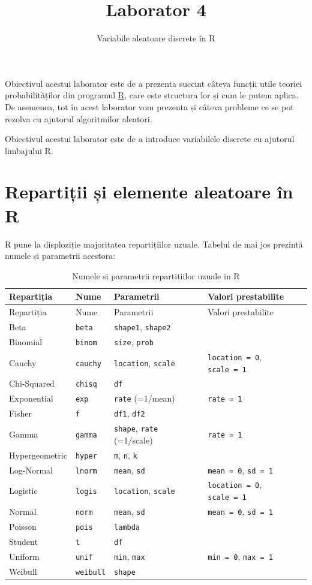 \documentclass[]{article}
\title{Laborator 4}
\subtitle{Variabile aleatoare discrete în R}
\author{}
\date{}
\begin{document}
\maketitle

\thispagestyle{fancy}

Obiectivul acestui laborator este de a prezenta succint câteva funcții
utile teoriei probabilităților din programul
\href{https://cran.r-project.org/}{R}, care este structura lor și cum le
putem aplica. De asemenea, tot în acest laborator vom prezenta și câteva
probleme ce se pot rezolva cu ajutorul algoritmilor aleatori.

Obiectivul acestui laborator este de a introduce variabilele discrete cu
ajutorul limbajului R.

\section{Repartiții și elemente aleatoare în
R}\label{repartitii-si-elemente-aleatoare-in-r}

R pune la disploziție majoritatea repartițiilor uzuale. Tabelul de mai
jos prezintă numele și parametrii acestora:

\begin{longtable}[]{@{}llll@{}}
\caption{Numele si parametrii repartitiilor uzuale in R}\tabularnewline
\toprule
Repartiția & Nume & Parametrii & Valori prestabilite\tabularnewline
\midrule
\endfirsthead
\toprule
Repartiția & Nume & Parametrii & Valori prestabilite\tabularnewline
\midrule
\endhead
Beta & \texttt{beta} & \texttt{shape1}, \texttt{shape2} &\tabularnewline
Binomial & \texttt{binom} & \texttt{size}, \texttt{prob}
&\tabularnewline
Cauchy & \texttt{cauchy} & \texttt{location}, \texttt{scale} &
\texttt{location\ =\ 0}, \texttt{scale\ =\ 1}\tabularnewline
Chi-Squared & \texttt{chisq} & \texttt{df} &\tabularnewline
Exponential & \texttt{exp} & \texttt{rate} (=1/mean) &
\texttt{rate\ =\ 1}\tabularnewline
Fisher & \texttt{f} & \texttt{df1}, \texttt{df2} &\tabularnewline
Gamma & \texttt{gamma} & \texttt{shape}, \texttt{rate} (=1/scale) &
\texttt{rate\ =\ 1}\tabularnewline
Hypergeometric & \texttt{hyper} & \texttt{m}, \texttt{n}, \texttt{k}
&\tabularnewline
Log-Normal & \texttt{lnorm} & \texttt{mean}, \texttt{sd} &
\texttt{mean\ =\ 0}, \texttt{sd\ =\ 1}\tabularnewline
Logistic & \texttt{logis} & \texttt{location}, \texttt{scale} &
\texttt{location\ =\ 0}, \texttt{scale\ =\ 1}\tabularnewline
Normal & \texttt{norm} & \texttt{mean}, \texttt{sd} &
\texttt{mean\ =\ 0}, \texttt{sd\ =\ 1}\tabularnewline
Poisson & \texttt{pois} & \texttt{lambda} &\tabularnewline
Student & \texttt{t} & \texttt{df} &\tabularnewline
Uniform & \texttt{unif} & \texttt{min}, \texttt{max} &
\texttt{min\ =\ 0}, \texttt{max\ =\ 1}\tabularnewline
Weibull & \texttt{weibull} & \texttt{shape} &\tabularnewline
\bottomrule
\end{longtable}
\end{document}
